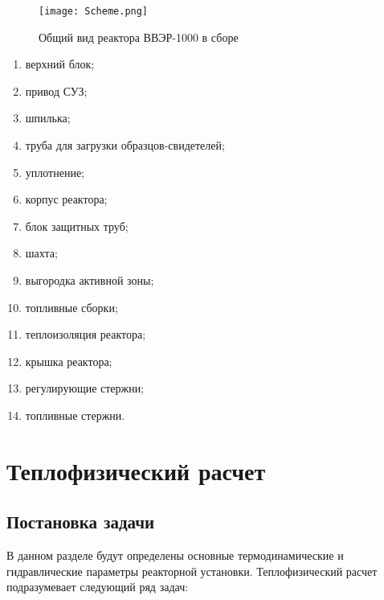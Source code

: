 %
\noindent
\begin{minipage}[t]{.5\textwidth}
\raggedright

\begin{figure}[H]
	\begin{center}
		\texttt{[image: Scheme.png]}
		\caption{\small Общий вид реактора ВВЭР-1000 в сборе }
		\label{pic:scheme} %
	\end{center}
\end{figure}
%
\end{minipage}%
\begin{minipage}[t]{.5\textwidth}
\raggedright
\begin{enumerate}
\item верхний блок; 
\item привод СУЗ;
\item шпилька;
\item труба для загрузки образцов-свидетелей;
\item уплотнение;
\item корпус реактора;
\item блок защитных труб;
\item шахта;
\item выгородка активной зоны;
\item топливные сборки;
\item теплоизоляция реактора; 
\item крышка реактора;
\item регулирующие стержни;
\item топливные стержни.
\end{enumerate}
\end{minipage}

\section{Теплофизический расчет}

\subsection{Постановка задачи}
В данном разделе будут определены основные термодинамические и гидравлические параметры реакторной установки. Теплофизический расчет подразумевает следующий ряд задач:

